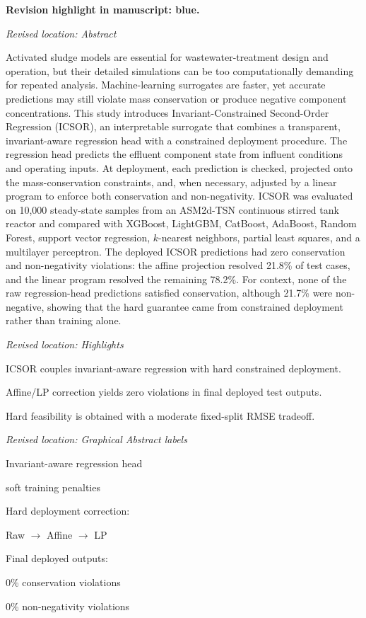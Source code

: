 \documentclass[11pt,a4paper]{article}
\newcommand{\revisionnotice}{\par\noindent\textcolor{revisionblue}{\textbf{Revision highlight in manuscript: blue.}}\par}
\newcommand{\excerptlocation}[1]{\par\noindent\textit{Revised location: #1}\par}
\begin{document}
\revisionnotice

\excerptlocation{Abstract}
\begin{revisionexcerpt}
Activated sludge models are essential for wastewater-treatment design and operation, but their detailed simulations can be too computationally demanding for repeated analysis. Machine-learning surrogates are faster, yet accurate predictions may still violate mass conservation or produce negative component concentrations. This study introduces Invariant-Constrained Second-Order Regression (ICSOR), an interpretable surrogate that combines a transparent, invariant-aware regression head with a constrained deployment procedure. The regression head predicts the effluent component state from influent conditions and operating inputs. At deployment, each prediction is checked, projected onto the mass-conservation constraints, and, when necessary, adjusted by a linear program to enforce both conservation and non-negativity. ICSOR was evaluated on 10,000 steady-state samples from an ASM2d-TSN continuous stirred tank reactor and compared with XGBoost, LightGBM, CatBoost, AdaBoost, Random Forest, support vector regression, $k$-nearest neighbors, partial least squares, and a multilayer perceptron. The deployed ICSOR predictions had zero conservation and non-negativity violations: the affine projection resolved 21.8\% of test cases, and the linear program resolved the remaining 78.2\%. For context, none of the raw regression-head predictions satisfied conservation, although 21.7\% were non-negative, showing that the hard guarantee came from constrained deployment rather than training alone.
\end{revisionexcerpt}

\excerptlocation{Highlights}
\begin{revisionexcerpt}
ICSOR couples invariant-aware regression with hard constrained deployment.

Affine/LP correction yields zero violations in final deployed test outputs.

Hard feasibility is obtained with a moderate fixed-split RMSE tradeoff.
\end{revisionexcerpt}

\excerptlocation{Graphical Abstract labels}
\begin{revisionexcerpt}
Invariant-aware regression head

soft training penalties

Hard deployment correction:

Raw $\rightarrow$ Affine $\rightarrow$ LP

Final deployed outputs:

0\% conservation violations

0\% non-negativity violations

\end{revisionexcerpt}
\end{document}
